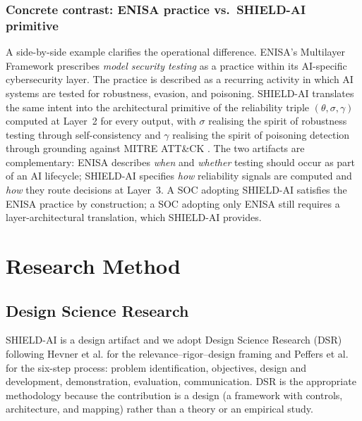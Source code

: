 \documentclass[preprint,12pt,authoryear]{elsarticle}
\begin{document}
\subsubsection{Concrete contrast: ENISA practice vs.\ SHIELD-AI primitive}
\label{ssec:enisaexample}
A side-by-side example clarifies the operational difference. ENISA's Multilayer Framework \citep{enisa2023multilayer} prescribes \emph{model security testing} as a practice within its AI-specific cybersecurity layer. The practice is described as a recurring activity in which AI systems are tested for robustness, evasion, and poisoning. SHIELD-AI translates the same intent into the architectural primitive of the reliability triple $(\theta, \sigma, \gamma)$ computed at Layer~2 for every output, with $\sigma$ realising the spirit of robustness testing through self-consistency \citep{manakul2023selfcheckgpt} and $\gamma$ realising the spirit of poisoning detection through grounding against MITRE ATT\&CK \citep{mitre2024attck}. The two artifacts are complementary: ENISA describes \emph{when} and \emph{whether} testing should occur as part of an AI lifecycle; SHIELD-AI specifies \emph{how} reliability signals are computed and \emph{how} they route decisions at Layer~3. A SOC adopting SHIELD-AI satisfies the ENISA practice by construction; a SOC adopting only ENISA still requires a layer-architectural translation, which SHIELD-AI provides.

\section{Research Method}
\label{sec:method}

\subsection{Design Science Research}
SHIELD-AI is a design artifact and we adopt Design Science Research (DSR) following Hevner et al. \citep{hevner2004dsr} for the relevance--rigor--design framing and Peffers et al. \citep{peffers2007dsrm} for the six-step process: problem identification, objectives, design and development, demonstration, evaluation, communication. DSR is the appropriate methodology because the contribution is a design (a framework with controls, architecture, and mapping) rather than a theory or an empirical study.
\end{document}
